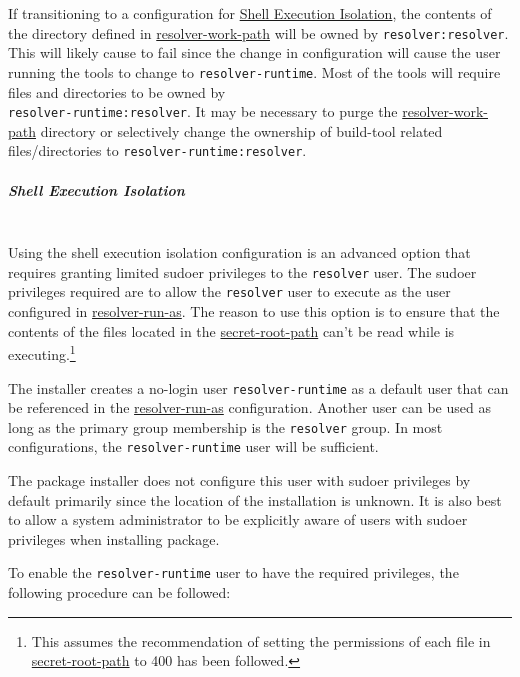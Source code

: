 If transitioning to a configuration for \hyperref[par:shell-agent-isolation]{Shell Execution Isolation}, the contents of the directory
defined in \hyperref[sec:agent-resolver-work-path]{resolver-work-path} will be owned by \texttt{resolver:resolver}.  This will likely
cause \scaresolver to fail since the change in configuration will cause the user running the tools to change to
\texttt{resolver-runtime}.  Most of the tools will require files and directories to be owned by\\\texttt{resolver-runtime:resolver}.
It may be necessary to purge the \hyperref[sec:agent-resolver-work-path]{resolver-work-path} directory or selectively change
the ownership of build-tool related files/directories to \texttt{resolver-runtime:resolver}.


\subparagraph{Shell Execution Isolation}\label{par:shell-agent-isolation}
\noindent\\Using the shell execution isolation configuration is an advanced option that requires granting limited sudoer privileges
to the \texttt{resolver} user.  The sudoer privileges required are to allow the \texttt{resolver} user to execute \scaresolver
as the user configured in \hyperref[sec:agent-resolver-run-as]{resolver-run-as}.  The reason to use this option is to ensure that
the contents of the files located in the \hyperref[sec:yaml-secret-root-path]{secret-root-path} can't be read while \scaresolver
is executing.\footnote{This assumes the recommendation of setting the permissions of each file in 
\hyperref[sec:yaml-secret-root-path]{secret-root-path} to 400 has been followed.}

The installer creates a no-login user \texttt{resolver-runtime} as a default user that can be referenced in the \hyperref[sec:agent-resolver-run-as]{resolver-run-as}
configuration.  Another user can be used as long as the primary group membership is the \texttt{resolver} group.  In most configurations, 
the \texttt{resolver-runtime} user will be sufficient.

The package installer does not configure this user with sudoer privileges by default primarily since the location of the \scaresolver
installation is unknown.  It is also best to allow a system administrator to be explicitly aware of users with sudoer privileges when installing
package.

To enable the \texttt{resolver-runtime} user to have the required privileges, the following procedure can be followed:

